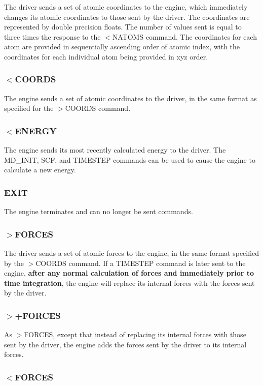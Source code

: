 The driver sends a set of atomic coordinates to the engine, which immediately changes its atomic coordinates to those sent by the driver. The coordinates are represented by double precision floats. The number of values sent is equal to three times the response to the $<$N\-A\-T\-O\-M\-S command. The coordinates for each atom are provided in sequentially ascending order of atomic index, with the coordinates for each individual atom being provided in xyz order.\hypertarget{index_send_coords}{}\subsubsection{$<$\-C\-O\-O\-R\-D\-S}\label{index_send_coords}
The engine sends a set of atomic coordinates to the driver, in the same format as specified for the {\ttfamily $>$C\-O\-O\-R\-D\-S} command.\hypertarget{index_recv_energy}{}\subsubsection{$<$\-E\-N\-E\-R\-G\-Y}\label{index_recv_energy}
The engine sends its most recently calculated energy to the driver. The {\ttfamily M\-D\-\_\-\-I\-N\-I\-T}, {\ttfamily S\-C\-F}, and {\ttfamily T\-I\-M\-E\-S\-T\-E\-P} commands can be used to cause the engine to calculate a new energy.\hypertarget{index_exit_command}{}\subsubsection{E\-X\-I\-T}\label{index_exit_command}
The engine terminates and can no longer be sent commands.\hypertarget{index_send_forces}{}\subsubsection{$>$\-F\-O\-R\-C\-E\-S}\label{index_send_forces}
The driver sends a set of atomic forces to the engine, in the same format specified by the {\ttfamily $>$C\-O\-O\-R\-D\-S} command. If a {\ttfamily T\-I\-M\-E\-S\-T\-E\-P} command is later sent to the engine, {\bfseries  after any normal calculation of forces and immediately prior to time integration}, the engine will replace its internal forces with the forces sent by the driver.\hypertarget{index_send_add_forces}{}\subsubsection{$>$+\-F\-O\-R\-C\-E\-S}\label{index_send_add_forces}
As {\ttfamily $>$F\-O\-R\-C\-E\-S}, except that instead of replacing its internal forces with those sent by the driver, the engine adds the forces sent by the driver to its internal forces.\hypertarget{index_recv_forces}{}\subsubsection{$<$\-F\-O\-R\-C\-E\-S}\label{index_recv_forces}
